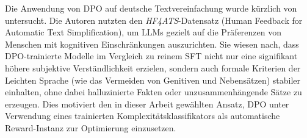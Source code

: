 Die Anwendung von DPO auf deutsche Textvereinfachung wurde kürzlich von \citet{dpo2025personalizing} untersucht. Die Autoren nutzten den \textit{HF4ATS}-Datensatz (Human Feedback for Automatic Text Simplification), um LLMs gezielt auf die Präferenzen von Menschen mit kognitiven Einschränkungen auszurichten. Sie wiesen nach, dass DPO-trainierte Modelle im Vergleich zu reinem SFT nicht nur eine signifikant höhere subjektive Verständlichkeit erzielen, sondern auch formale Kriterien der Leichten Sprache (wie das Vermeiden von Genitiven und Nebensätzen) stabiler einhalten, ohne dabei halluzinierte Fakten oder unzusammenhängende Sätze zu erzeugen. Dies motiviert den in dieser Arbeit gewählten Ansatz, DPO unter Verwendung eines trainierten Komplexitätsklassifikators als automatische Reward-Instanz zur Optimierung einzusetzen.
